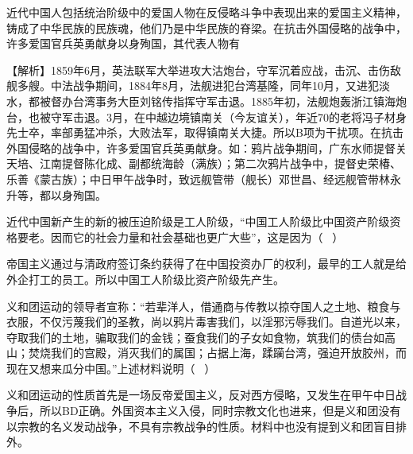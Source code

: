 \question 近代中国人包括统治阶级中的爱国人物在反侵略斗争中表现出来的爱国主义精神，铸成了中华民族的民族魂，他们乃是中华民族的脊梁。在抗击外国侵略的战争中，许多爱国官兵英勇献身以身殉国，其代表人物有
\par{}
\begin{solution}【解析】1859年6月，英法联军大举进攻大沽炮台，守军沉着应战，击沉、击伤敌舰多艘。中法战争期间，1884年8月，法舰进犯台湾基隆，同年10月，又进犯淡水，都被督办台湾事务大臣刘铭传指挥守军击退。1885年初，法舰炮轰浙江镇海炮台，也被守军击退。3月，在中越边境镇南关（今友谊关），年近70的老将冯子材身先士卒，率部勇猛冲杀，大败法军，取得镇南关大捷。所以B项为干扰项。在抗击外国侵略的战争中，许多爱国官兵英勇献身。如：鸦片战争期间，广东水师提督关天培、江南提督陈化成、副都统海龄（满族）；第二次鸦片战争中，提督史荣椿、乐善《蒙古族）；中日甲午战争时，致远舰管带（舰长）邓世昌、经远舰管带林永升等，都以身殉国。
\end{solution}
\question 近代中国新产生的新的被压迫阶级是工人阶级，``中国工人阶级比中国资产阶级资格要老。因而它的社会力量和社会基础也更广大些''，这是因为（
~）
\par{}
\begin{solution}帝国主义通过与清政府签订条约获得了在中国投资办厂的权利，最早的工人就是给外企打工的员工。所以中国工人阶级比资产阶级先产生。
\end{solution}
\question 义和团运动的领导者宣称：``若辈洋人，借通商与传教以掠夺国人之土地、粮食与衣服，不仅污蔑我们的圣教，尚以鸦片毒害我们，以淫邪污辱我们。自道光以来，夺取我们的土地，骗取我们的金钱；蚕食我们的子女如食物，筑我们的债台如高山；焚烧我们的宫殿，消灭我们的属国；占据上海，蹂躏台湾，强迫开放胶州，而现在又想来瓜分中国。''上述材料说明（
~）
\par{}
\begin{solution}义和团运动的性质首先是一场反帝爱国主义，反对西方侵略，又发生在甲午中日战争后，所以BD正确。外国资本主义入侵，同时宗教文化也进来，但是义和团没有以宗教的名义发动战争，不具有宗教战争的性质。材料中也没有提到义和团盲目排外。
\end{solution}
